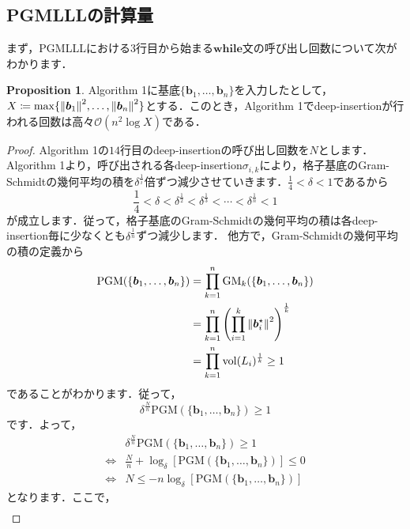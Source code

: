 \documentclass[a4j, dvipdfmx]{jsarticle}
\theoremstyle{definition}
\newtheorem{proposition}[definition]{Proposition}
\begin{document}
\subsection{PGMLLLの計算量}

まず，PGMLLLにおける$3$行目から始まる$\textbf{while}$文の呼び出し回数について次がわかります．

\begin{proposition}
    Algorithm 1に基底$\{\boldsymbol{b}_1,\ldots,\boldsymbol{b}_n\}$を入力したとして，$X\coloneqq \max\{\norm{\boldsymbol{b}_1}^2, \ldots,\norm{\boldsymbol{b}_n}^2\}$とする．このとき，Algorithm 1でdeep-insertionが行われる回数は高々$\mathcal{O}(n^2\log X)$である．
\end{proposition}

\begin{proof}
    Algorithm 1の$14$行目のdeep-insertionの呼び出し回数を$N$とします．Algorithm 1より，呼び出される各deep-insertion$\sigma_{i, k}$により，格子基底のGram-Schmidtの幾何平均の積を$\delta^{\frac{1}{i}}$倍ずつ減少させていきます．$\frac{1}{4}<\delta<1$であるから
    $$
    \frac{1}{4}<\delta<\delta^\frac{1}{2}<\delta^\frac{1}{3}<\cdots <\delta^\frac{1}{n}<1
    $$
    が成立します．従って，格子基底のGram-Schmidtの幾何平均の積は各deep-insertion毎に少なくとも$\delta^\frac{1}{n}$ずつ減少します．
    他方で，Gram-Schmidtの幾何平均の積の定義から
    $$
    \begin{aligned}
    \mathrm{PGM}(\{\boldsymbol{b}_1,\ldots,\boldsymbol{b}_n\})&= \prod_{k=1}^n \mathrm{GM}_k(\{\boldsymbol{b}_1,\ldots,\boldsymbol{b}_n\})\\
    &=\prod_{k=1}^{n}\left(\prod_{i=1}^{k} \norm{\boldsymbol{b}_i^\star}^2\right)^{\frac{1}{k}}\\
    &=\prod_{k=1}^n \mathrm{vol}(L_i)^\frac{1}{k}\ge 1
    \end{aligned}
    $$
    であることがわかります．従って，
    $$
    \delta^{\frac{N}{n}}\mathrm{PGM}(\{\boldsymbol{b}_1,\ldots,\boldsymbol{b}_n\})\ge 1
    $$
    です．よって，
    $$
    \begin{aligned}
    &\delta^{\frac{N}{n}}\mathrm{PGM}(\{\boldsymbol{b}_1,\ldots,\boldsymbol{b}_n\})\ge 1\\
    \iff& \frac{N}{n}+\log_{\delta}[\mathrm{PGM}(\{\boldsymbol{b}_1,\ldots,\boldsymbol{b}_n\})]\le 0\\
    \iff& N\le -n\log_\delta\left[\mathrm{PGM}(\{\boldsymbol{b}_1,\ldots,\boldsymbol{b}_n\})\right]
    \end{aligned}
    $$
    となります．ここで，
    $$
    \begin{aligned}

\end{aligned}$$
\end{proof}
\end{document}

